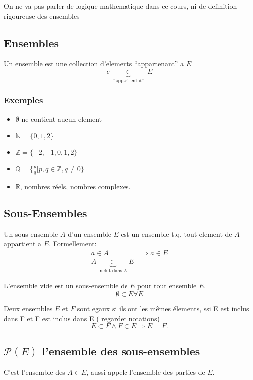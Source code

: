 \documentclass[../main.tex]{subfiles}
\begin{document}
On ne va pas parler de logique mathematique dans ce cours, ni de definition rigoureuse des ensembles

\subsection{Ensembles}
Un ensemble est une collection d'elements ``appartenant'' a $E$
\[ 
	e \underbrace{\in}_{\text{ ``appartient à'' }} E
\]

\subsubsection{Exemples}
\begin{itemize}
	\item $\emptyset$ ne contient aucun element\\
	\item $ \mathbb{N} = \{ 0,1,2 \}$\\
	\item $\mathbb{Z} = \{-2,-1,0,1,2\}$\\
	\item $\mathbb{Q} = \{ \frac{p}{q} \vert p,q \in \mathbb{Z}, q \neq 0 \}$
	\item $\mathbb{R}$, nombres réels, nombres complexes.
\end{itemize}
\subsection{Sous-Ensembles}
Un sous-ensemble $A$ d'un ensemble $E$ est un ensemble t.q. tout element de $A$ appartient a $E$.
Formellement:
\begin{align*}
	a \in A &\Rightarrow a \in E\\
	A \underbrace{ \subset }_{ \text{inclut dans $E$}} E
\end{align*}

L'ensemble vide est un sous-ensemble de $E$ pour tout ensemble $E$.\\
\[ 
\emptyset \subset E \forall E
\]


Deux ensembles $E$ et $F$ sont egaux si ils ont les mêmes élements, ssi
E est inclus dans F et F est inclus dans E ( regarder  notations)
\[ 
E \subset F \land F \subset E \Rightarrow E = F.
\]

\subsection{$\mathcal{P}(E)$ l'ensemble des sous-ensembles}
C'est l'ensemble des $A \in E$, aussi appelé l'ensemble des parties de $E$.
\end{document}
